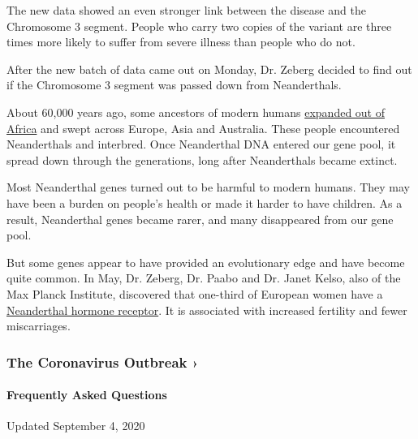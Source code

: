 The new data showed an even stronger link between the disease and the
Chromosome 3 segment. People who carry two copies of the variant are
three times more likely to suffer from severe illness than people who do
not.

After the new batch of data came out on Monday, Dr. Zeberg decided to
find out if the Chromosome 3 segment was passed down from Neanderthals.

About 60,000 years ago, some ancestors of modern humans
\href{https://www.nytimes3xbfgragh.onion/2020/01/31/science/neanderthal-dna-africa.html}{expanded
out of Africa} and swept across Europe, Asia and Australia. These people
encountered Neanderthals and interbred. Once Neanderthal DNA entered our
gene pool, it spread down through the generations, long after
Neanderthals became extinct.

Most Neanderthal genes turned out to be harmful to modern humans. They
may have been a burden on people's health or made it harder to have
children. As a result, Neanderthal genes became rarer, and many
disappeared from our gene pool.

But some genes appear to have provided an evolutionary edge and have
become quite common. In May, Dr. Zeberg, Dr. Paabo and Dr. Janet Kelso,
also of the Max Planck Institute, discovered that one-third of European
women have a
\href{https://academic.oup.com/mbe/article/doi/10.1093/molbev/msaa119/5841671}{Neanderthal
hormone receptor}. It is associated with increased fertility and fewer
miscarriages.

\href{https://www.nytimes3xbfgragh.onion/news-event/coronavirus?action=click\&pgtype=Article\&state=default\&region=MAIN_CONTENT_3\&context=storylines_faq}{}

\hypertarget{the-coronavirus-outbreak-}{%
\subsubsection{The Coronavirus Outbreak
›}\label{the-coronavirus-outbreak-}}

\hypertarget{frequently-asked-questions}{%
\paragraph{Frequently Asked
Questions}\label{frequently-asked-questions}}

Updated September 4, 2020

